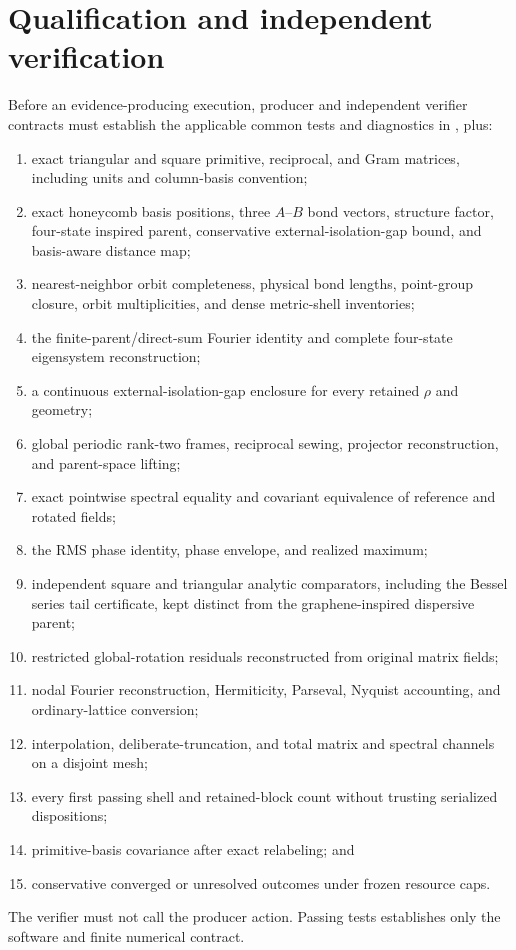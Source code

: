 \documentclass[11pt]{article}
\begin{document}
\section{Qualification and independent verification}

Before an evidence-producing execution, producer and independent verifier contracts
must establish the applicable common tests and diagnostics in
, plus:
\begin{enumerate}[label=\arabic*.]
 \item exact triangular and square primitive, reciprocal, and Gram matrices, including
       units and column-basis convention;
 \item exact honeycomb basis positions, three $A$--$B$ bond vectors, structure factor,
       four-state inspired parent, conservative external-isolation-gap bound, and basis-aware
       distance map;
 \item nearest-neighbor orbit completeness, physical bond lengths, point-group closure,
       orbit multiplicities, and dense metric-shell inventories;
 \item the finite-parent/direct-sum Fourier identity and complete four-state
       eigensystem reconstruction;
 \item a continuous external-isolation-gap enclosure for every retained $\rho$ and geometry;
 \item global periodic rank-two frames, reciprocal sewing, projector reconstruction,
       and parent-space lifting;
 \item exact pointwise spectral equality and covariant equivalence of reference and
       rotated fields;
 \item the RMS phase identity, phase envelope, and realized maximum;
 \item independent square and triangular analytic comparators, including the Bessel
       series tail certificate, kept distinct from the graphene-inspired dispersive
       parent;
 \item restricted global-rotation residuals reconstructed from original matrix fields;
 \item nodal Fourier reconstruction, Hermiticity, Parseval, Nyquist accounting, and
       ordinary-lattice conversion;
 \item interpolation, deliberate-truncation, and total matrix and spectral channels on
       a disjoint mesh;
 \item every first passing shell and retained-block count without trusting serialized
       dispositions;
 \item primitive-basis covariance after exact relabeling; and
 \item conservative converged or unresolved outcomes under frozen resource caps.
\end{enumerate}
The verifier must not call the producer action.  Passing tests establishes only the
software and finite numerical contract.
\end{document}

